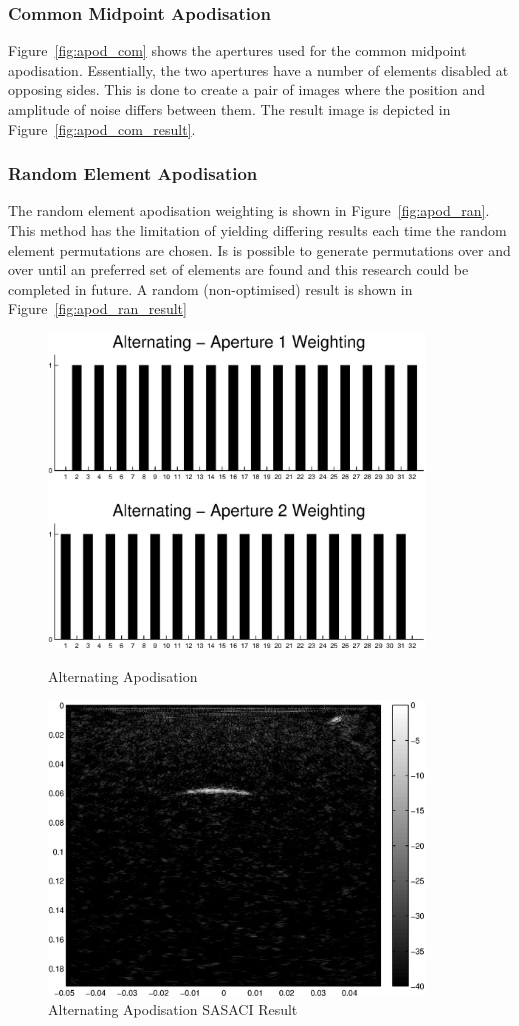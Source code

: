 \subsubsection{Common Midpoint Apodisation}

Figure~\ref{fig:apod_com} shows the apertures used for the common midpoint apodisation. Essentially, the two apertures have a number of elements disabled at opposing sides. This is done to create a pair of images where the position and amplitude of noise differs between them. The result image is depicted in Figure~\ref{fig:apod_com_result}. 

\subsubsection{Random Element Apodisation}
The random element apodisation weighting is shown in Figure~\ref{fig:apod_ran}. This method has the limitation of yielding differing results each time the random element permutations are chosen. Is is possible to generate permutations over and over until an preferred set of elements are found and this research could be completed in future. A random (non-optimised) result is shown in Figure~\ref{fig:apod_ran_result}

\begin{figure}[p]
\centering
		\includegraphics[width=100mm]{Alternating.eps}
		\caption{Alternating Apodisation}
		\label{fig:apod_alt}

		\includegraphics[width=100mm]{SAC_Alternating.eps}
		\caption{Alternating Apodisation SASACI Result}
		\label{fig:apod_alt_result}
\end{figure}

